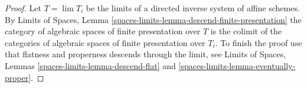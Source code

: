 \documentclass{stacks-project}
\theoremstyle{plain}
\theoremstyle{definition}
\theoremstyle{remark}
\numberwithin{equation}{subsection}
\def\lim{\mathop{\mathrm{lim}}\nolimits}
\begin{document}
\begin{proof}
Let $T = \lim T_i$ be the limits of a
directed inverse system of affine schemes.
By Limits of Spaces, Lemma
\ref{spaces-limits-lemma-descend-finite-presentation}
the category of algebraic spaces of finite presentation
over $T$ is the colimit of the categories of algebraic spaces
of finite presentation over $T_i$.
To finish the proof use that flatness and properness
descends through the limit, see
Limits of Spaces, Lemmas
\ref{spaces-limits-lemma-descend-flat} and
\ref{spaces-limits-lemma-eventually-proper}.
\end{proof}
\end{document}
